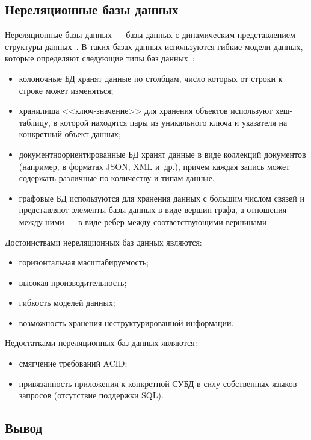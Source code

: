 \subsection{Нереляционные базы данных}

Нереляционные базы данных --- базы данных с динамическим представлением
структуры данных~\cite{art04}. В таких базах данных используются гибкие модели
данных, которые определяют следующие типы баз данных~\cite{art05}:
\begin{itemize}
    \item колоночные БД хранят данные по столбцам, число которых от строки к
        строке может изменяться;
    \item хранилища <<ключ-значение>> для хранения объектов используют
        хеш-таблицу, в которой находятся пары из уникального ключа и
        указателя на конкретный объект данных;
    \item документноориентированные БД хранят данные в виде коллекций
        документов (например, в форматах JSON, XML и~др.), причем каждая
        запись может содержать различные по количеству и типам данные.
    \item графовые БД используются для хранения данных с большим числом
        связей и представляют элементы базы данных в виде вершин графа, а
        отношения между ними --- в виде ребер между соответствующими
        вершинами.
\end{itemize}

Достоинствами нереляционных баз данных являются:
\begin{itemize}
    \item горизонтальная масштабируемость;
    \item  высокая производительность;
    \item гибкость моделей данных;
    \item возможность хранения неструктурированной информации.
\end{itemize}

Недостатками нереляционных баз данных являются:
\begin{itemize}
    \item смягчение требований ACID;
    \item привязанность приложения к конкретной СУБД в силу собственных
        языков запросов (отсутствие поддержки SQL).
\end{itemize}

\subsection*{Вывод}

